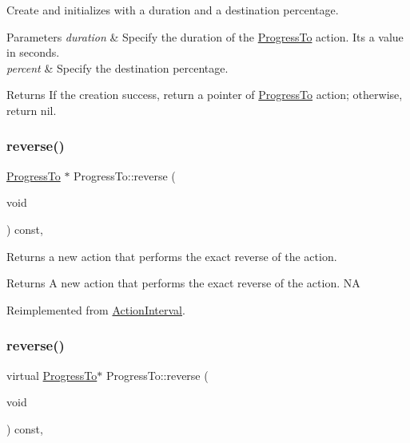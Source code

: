 Create and initializes with a duration and a destination percentage. 


\begin{DoxyParams}{Parameters}
{\em duration} & Specify the duration of the \hyperlink{classProgressTo}{Progress\+To} action. It\textquotesingle{}s a value in seconds. \\
\hline
{\em percent} & Specify the destination percentage. \\
\hline
\end{DoxyParams}
\begin{DoxyReturn}{Returns}
If the creation success, return a pointer of \hyperlink{classProgressTo}{Progress\+To} action; otherwise, return nil. 
\end{DoxyReturn}
\mbox{\label{classProgressTo_af09c310239f700015d1875bdaf6dc8ae}} 
\subsubsection{\texorpdfstring{reverse()}{reverse()}\hspace{0.1cm}{\footnotesize\ttfamily [1/2]}}
{\footnotesize\ttfamily \hyperlink{classProgressTo}{Progress\+To} $\ast$ Progress\+To\+::reverse (\begin{DoxyParamCaption}\item[{void}]{ }\end{DoxyParamCaption}) const\hspace{0.3cm}{\ttfamily [override]}, {\ttfamily [virtual]}}

Returns a new action that performs the exact reverse of the action.

\begin{DoxyReturn}{Returns}
A new action that performs the exact reverse of the action.  NA 
\end{DoxyReturn}


Reimplemented from \hyperlink{classActionInterval_a9f9ac7164036a0bc261a72f62a2b2da7}{Action\+Interval}.

\mbox{\label{classProgressTo_ac8120eda623416e455871c5e25bac87e}} 
\subsubsection{\texorpdfstring{reverse()}{reverse()}\hspace{0.1cm}{\footnotesize\ttfamily [2/2]}}
{\footnotesize\ttfamily virtual \hyperlink{classProgressTo}{Progress\+To}$\ast$ Progress\+To\+::reverse (\begin{DoxyParamCaption}\item[{void}]{ }\end{DoxyParamCaption}) const\hspace{0.3cm}{\ttfamily [override]}, {\ttfamily [virtual]}}

